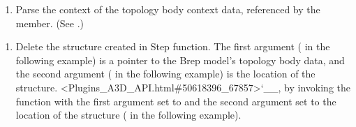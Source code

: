\documentclass[letterpaper,12pt,english,openany,oneside]{sphinxmanual}
\begin{document}
\begin{sphinxVerbatim}[commandchars=\\\{\}]
 
    
\end{sphinxVerbatim}
\begin{enumerate}
%
\setcounter{enumi}{2}
\item {} 
Parse the context of the topology body context data, referenced by the  member. (See .)

\end{enumerate}

\begin{sphinxVerbatim}[commandchars=\\\{\}]
\end{sphinxVerbatim}
\begin{enumerate}
%
\setcounter{enumi}{3}
\item {} 
Delete the  structure created in Step  function. The first argument ( in the following example) is a pointer to the Brep model’s topology body data, and the second argument ( in the following example) is the location of the  structure. <Plugins\_A3D\_API.html\#50618396\_67857>`\_\_, by invoking the  function with the first argument set to  and the second argument set to the location of the structure ( in the following example).

\end{enumerate}

\begin{sphinxVerbatim}[commandchars=\\\{\}]
 
\end{sphinxVerbatim}
\end{document}
